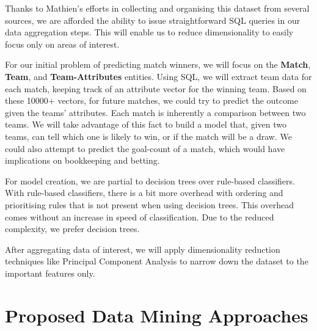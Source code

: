 \documentclass[11pt, letterpaper]{article}
\begin{document}
Thanks to Mathien's efforts in collecting and organising this dataset from several sources, we are afforded the ability to issue straightforward SQL queries in our data aggregation steps.
This will enable us to reduce dimensionality to easily focus only on areas of interest.

For our initial problem of predicting match winners, we will focus on the \textbf{Match}, \textbf{Team}, and \textbf{Team-Attributes} entities.
Using SQL, we will extract team data for each match, keeping track of an attribute vector for the winning team.
Based on these 10000+ vectors, for future matches, we could try to predict the outcome given the teams' attributes.
Each match is inherently a comparison between two teams.
We will take advantage of this fact to build a model that, given two teams, can tell which one is likely to win, or if the match will be a draw.
We could also attempt to predict the goal-count of a match, which would have implications on bookkeeping and betting.

For model creation, we are partial to decision trees over rule-based classifiers.
With rule-based classifiers, there is a bit more overhead with ordering and prioritising rules that is not present when using decision trees. 
This overhead comes without an increase in speed of classification. Due to the reduced complexity, we prefer decision trees.

After aggregating data of interest, we will apply dimensionality reduction techniques like Principal Component Analysis to narrow down the dataset to the important features only.

\section*{Proposed Data Mining Approaches}
\end{document}
